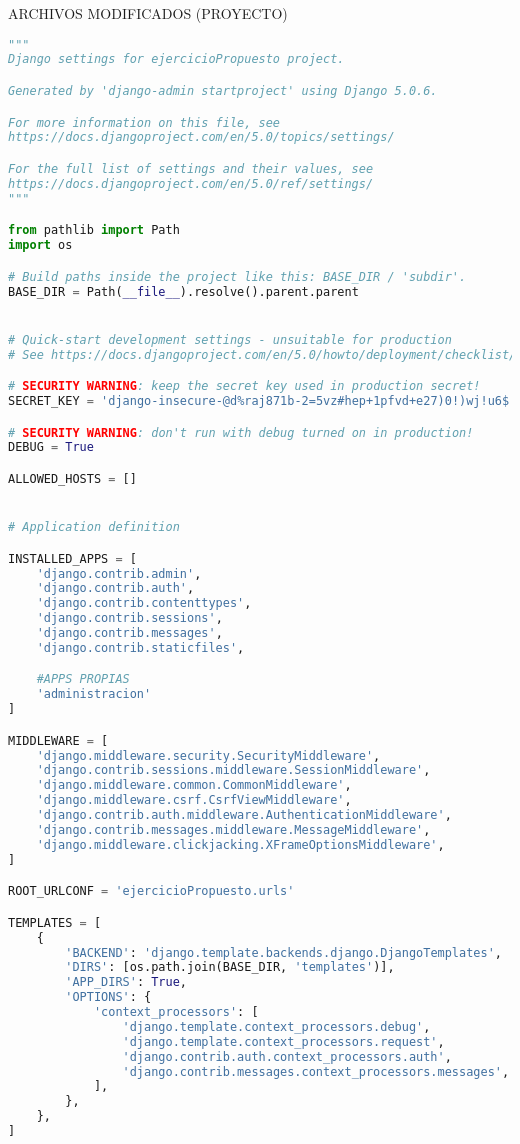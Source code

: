 \documentclass{article}
\begin{document}
        \item ARCHIVOS MODIFICADOS (PROYECTO)
        
        \begin{lstlisting}[language=Python, caption=settings.py]
"""
Django settings for ejercicioPropuesto project.

Generated by 'django-admin startproject' using Django 5.0.6.

For more information on this file, see
https://docs.djangoproject.com/en/5.0/topics/settings/

For the full list of settings and their values, see
https://docs.djangoproject.com/en/5.0/ref/settings/
"""

from pathlib import Path
import os

# Build paths inside the project like this: BASE_DIR / 'subdir'.
BASE_DIR = Path(__file__).resolve().parent.parent


# Quick-start development settings - unsuitable for production
# See https://docs.djangoproject.com/en/5.0/howto/deployment/checklist/

# SECURITY WARNING: keep the secret key used in production secret!
SECRET_KEY = 'django-insecure-@d%raj871b-2=5vz#hep+1pfvd+e27)0!)wj!u6$!@ic10e5@u'

# SECURITY WARNING: don't run with debug turned on in production!
DEBUG = True

ALLOWED_HOSTS = []


# Application definition

INSTALLED_APPS = [
    'django.contrib.admin',
    'django.contrib.auth',
    'django.contrib.contenttypes',
    'django.contrib.sessions',
    'django.contrib.messages',
    'django.contrib.staticfiles',

    #APPS PROPIAS
    'administracion'
]

MIDDLEWARE = [
    'django.middleware.security.SecurityMiddleware',
    'django.contrib.sessions.middleware.SessionMiddleware',
    'django.middleware.common.CommonMiddleware',
    'django.middleware.csrf.CsrfViewMiddleware',
    'django.contrib.auth.middleware.AuthenticationMiddleware',
    'django.contrib.messages.middleware.MessageMiddleware',
    'django.middleware.clickjacking.XFrameOptionsMiddleware',
]

ROOT_URLCONF = 'ejercicioPropuesto.urls'

TEMPLATES = [
    {
        'BACKEND': 'django.template.backends.django.DjangoTemplates',
        'DIRS': [os.path.join(BASE_DIR, 'templates')],
        'APP_DIRS': True,
        'OPTIONS': {
            'context_processors': [
                'django.template.context_processors.debug',
                'django.template.context_processors.request',
                'django.contrib.auth.context_processors.auth',
                'django.contrib.messages.context_processors.messages',
            ],
        },
    },
]


\end{lstlisting}
\end{document}
